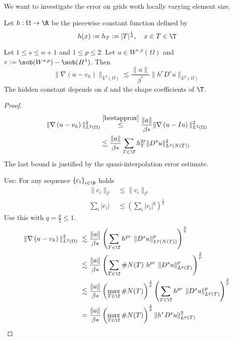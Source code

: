 We want to investigate the error on grids woth locally varying element size.
\begin{definition}
	Let $h:\Omega \to \R$ be the piecewise constant function defined by 
	\begin{equation*}
		h(x) := h_{T} := |T|^{\frac{1}{d}}, \quad x \in T \in \T
	\end{equation*}
\end{definition}
\begin{theorem}\label{thrmA}
	Let $1\leq s \leq n+1$ and $1 \leq p \leq 2$. Let $u \in W^{s,p}(\Omega)$ and $r:= \sob(W^{s,p})- \sob(H^1)$. Then 
	\begin{equation*}
		\|\nabla \left( u - v_{h} \right)\|_{L^2(\Omega)} \lesssim \frac{ \|a\|}{\beta^*} \|h^r D^su\|_{L^p(\Omega)}
	\end{equation*}
	The hidden constant depends on $d$ and the shape coefficients of $\T$.
\end{theorem}
\begin{proof}
	\begin{align*}
		\|\nabla \left( u - v_{h} \right)\|^2_{L^2(\Omega)} &\overset{\eqref{bestapprox}}{\leq} \frac{ \|a\|}{\beta*} \|\nabla \left( u - Iu \right)\|^2_{L^2(\Omega)}\\
															& \lesssim \frac{ \|a\|}{\beta*} \sum\limits_{T \in \T} h_{T}^{2r} \|D^su\|^2_{L^p(N(T))}
	\end{align*}
	The last bound is justified by the quasi-interpolation error estimate.\nl

	Use: For any sequence $\left\{c_{i} \right\}_{i\in \N}$ holds
	\begin{align*}
	\|c_{i}\|_{l^1} &\leq \|c_{i}\|_{l^q}\\
	\sum\limits_{i} |c_{i}| &\leq \left( \sum\limits_{i} |c_{i}|^q \right)^{\frac{1}{q}}
	\end{align*}
	Use this with $q = \frac{p}{2} \leq 1$.	
	\begin{align*}
		\|\nabla \left( u - v_{h} \right)\|^2_{L^2(\Omega)} \ &\lesssim \frac{ \|a\|}{\beta*} \left( \sum\limits_{T \in \T } h^{pr}\  \|D^su\|^p_{L^p(N(T))} \right)^{\frac{2}{p}} \\
															&\lesssim \frac{ \|a\|}{\beta*} \left( \sum\limits_{T \in \T } \#N(T)\ h^{pr}\ \|D^su\|^p_{L^p(T)} \right)^{\frac{2}{p}} \\
															&\lesssim \frac{ \|a\|}{\beta*} \left( \max_{T \in \T} \# N(T) \right)^{\frac{2}{p}} \left( \sum\limits_{T \in \T } h^{pr}\ \|D^su\|^p_{L^p(T)} \right)^{\frac{2}{p}} \\
															&= \frac{ \|a\|}{\beta*} \left( \max_{T \in \T} \# N(T) \right)^{\frac{2}{p}} \|h^rD^su\|^2_{L^p(T)} \\
	\end{align*}
\end{proof}
